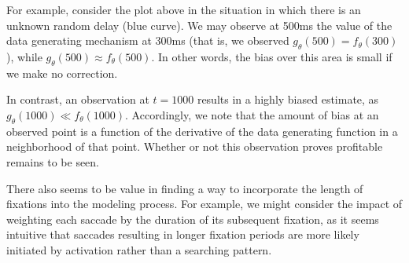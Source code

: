 \documentclass{article}
\begin{document}
For example, consider the plot above in the situation in which there is an unknown random delay (blue curve). We may observe at 500ms the value of the data generating mechanism at 300ms (that is, we observed $g_{\theta}(500) = f_{\theta}(300)$), while $g_{\theta}(500) \approx f_{\theta}(500)$. In other words, the bias over this area is small if we make no correction.

In contrast, an observation at $t = 1000$ results in a highly biased estimate, as $g_{\theta}(1000) \ll f_{\theta}(1000)$. Accordingly, we note that the amount of bias at an observed point is a function of the derivative of the data generating function in a neighborhood of that point. Whether or not this observation proves profitable remains to be seen.

There also seems to be value in finding a way to incorporate the length of fixations into the modeling process. For example, we might consider the impact of weighting each saccade by the duration of its subsequent fixation, as it seems intuitive that saccades resulting in longer fixation periods are more likely initiated by activation rather than a searching pattern.
\end{document}
